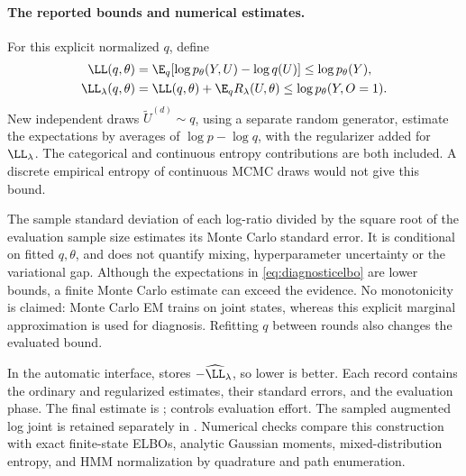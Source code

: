\paragraph{The reported bounds and numerical estimates.}
For this explicit normalized \(q\), define
\begin{align}
\LL(q,\theta)&=\E_q[\log p_\theta(Y,U)-\log q(U)]
\leq\log p_\theta(Y),\\
\LL_\lambda(q,\theta)&=\LL(q,\theta)+\E_qR_\lambda(U,\theta)
\leq\log p_\theta(Y,O=1).
\label{eq:diagnosticelbo}
\end{align}
New independent draws \(\widetilde U^{(d)}\sim q\), using a separate random
generator, estimate the expectations by averages of \(\log p-\log q\),
with the regularizer added for \(\LL_\lambda\). The categorical and
continuous entropy contributions are both included. A discrete empirical
entropy of continuous MCMC draws would not give this bound.

The sample standard deviation of each log-ratio divided by the square root
of the evaluation sample size estimates its Monte Carlo standard error.
It is conditional on fitted \(q,\theta\), and does not quantify mixing,
hyperparameter uncertainty or the variational gap. Although the expectations
in \eqref{eq:diagnosticelbo} are lower bounds, a finite Monte Carlo estimate
can exceed the evidence. No monotonicity is claimed: Monte Carlo EM trains
on joint states, whereas this explicit marginal approximation is used for
diagnosis. Refitting \(q\) between rounds also changes the evaluated bound.

In the automatic interface,  stores
\(-\widehat\LL_\lambda\), so lower is better. Each 
record contains the ordinary and regularized estimates, their standard
errors, and the evaluation phase. The final estimate is
;  controls evaluation effort.
The sampled augmented log joint is retained separately in
. Numerical checks compare this
construction with exact finite-state ELBOs, analytic Gaussian moments,
mixed-distribution entropy, and HMM normalization by quadrature and path
enumeration.
